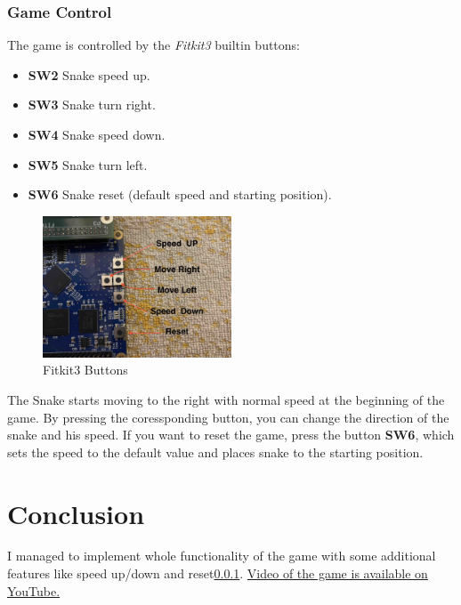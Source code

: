 \documentclass[a4paper, 11pt]{article}
\begin{document}
    \subsubsection{Game Control}\label{subsubsec:controling}
    The game is controlled by the \textit{Fitkit3} built\-in buttons:
    \begin{itemize}
        \item \textbf{SW2} \- Snake speed up.
        \item \textbf{SW3} \- Snake turn right.
        \item \textbf{SW4} \- Snake speed down.
        \item \textbf{SW5} \- Snake turn left.
        \item \textbf{SW6} \- Snake reset (default speed and starting position).
    \end{itemize}

    \begin{figure}[h!]
        \centering
        \includegraphics[width=0.5\textwidth]{buttons}
        \caption{Fitkit3 Buttons}\label{fig:figure2}
    \end{figure}

    The Snake starts moving to the right with normal speed
    at the beginning of the game.
    By pressing the coressponding button, you can change the direction of the snake
    and his speed.
    If you want to reset the game, press the button \textbf{SW6}, which sets
    the speed to the default value and places snake to the starting position.






    \section{Conclusion}\label{sec:conclusion}
    I managed to implement whole functionality of the game with some additional
    features like speed up/down and reset\ref{subsubsec:controling}.
    \href{https://youtu.be/3wGh9oV8RLc}{Video of the game is available on YouTube.}


    \clearpage
    
    \renewcommand{\refname}{Literature}\label{sec:literatura}
    
\end{document}
